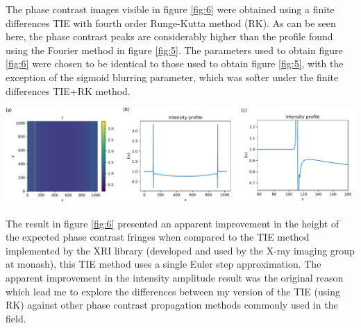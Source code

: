 \documentclass[10pt, a4paper, singlespacing]{report}
\newenvironment{Figure}
    {\par\medskip\noindent\minipage{\linewidth}}
    {\endminipage\par\medskip}
\begin{document}
The phase contrast images visible in figure \ref{fig:6} were obtained using a finite differences TIE with fourth order Runge-Kutta method (RK). As can be seen here, the phase contrast peaks are considerably higher than the profile found using the Fourier method in figure \ref{fig:5}. The parameters used to obtain figure \ref{fig:6} were chosen to be identical to those used to obtain figure \ref{fig:5}, with the exception of the sigmoid blurring parameter, which was softer under the finite differences TIE+RK method.
\begin{Figure} 
\centering
\includegraphics[width=\linewidth]{FD_intensity_profile.pdf}
\label{fig:6} 
\end{Figure}
The result in figure \ref{fig:6} presented an apparent improvement in the height of the expected phase contrast fringes when compared to the TIE method implemented by the XRI library (developed and used by the X-ray imaging group at monash), this TIE method uses a single Euler step approximation. The apparent improvement in the intensity amplitude result was the original reason which lead me to explore the differences between my version of the TIE (using RK) against other phase contrast propagation methods commonly used in the field.
\end{document}
